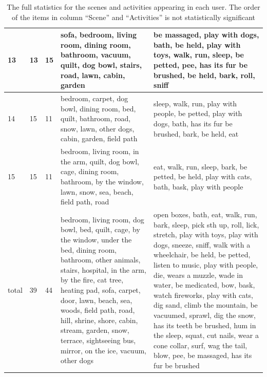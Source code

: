 \begin{table}[th]
\begin{center}
\begin{tabular}{l p{1cm} p{1cm} p{5cm} p{5cm}}
13 & 13 & 15 & sofa, bedroom, living room, dining room, bathroom, vacuum, quilt, dog bowl, stairs, road, lawn, cabin, garden & be massaged, play with dogs, bath, be held, play with toys, walk, run, sleep, be petted, pee, has its fur be brushed, be held, bark, roll, sniff\\\hline

14 & 15 & 11 & bedroom, carpet, dog bowl, dining room, bed, quilt, bathroom, road, snow, lawn, other dogs, cabin, garden, field path & sleep, walk, run, play with people, be petted, play with dogs, bath, has its fur be brushed, bark, be held, eat\\\hline

15 & 15 & 11 & bedroom, living room, in the arm, quilt, dog bowl, cage, dining room, bathroom, by the window, lawn, snow, sea, beach, field path, road & eat, walk, run, sleep, bark, be petted, be held, play with cats, bath, bask, play with people\\\hline

total & 39 & 44 & bedroom, living room, dog bowl, bed, quilt, cage, by the window, under the bed, dining room, bathroom, other animals, stairs, hospital, in the arm, by the fire, cat tree, heating pad, sofa, carpet, door, lawn, beach, sea, woods, field path, road, hill, shrine, shore, cabin, stream, garden, snow, terrace, sightseeing bus, mirror, on the ice, vacuum, other dogs & open boxes, bath, eat, walk, run, bark, sleep, pick sth up, roll, lick, stretch, play with toys, play with dogs, sneeze, sniff, walk with a wheelchair, be held, be petted, listen to music, play with people, die, wears a muzzle, wade in water, be medicated, bow, bask, watch fireworks, play with cats, dig sand, climb the mountain, be vacuumed, sprawl, dig the snow, has its teeth be brushed, hum in the sleep, squat, cut nails, wear a cone collar, surf, wag the tail, blow, pee, be massaged, has its fur be brushed\\
\hline
\end{tabular} 
\end{center}
\caption{The full statistics for the scenes and activities appearing in each user. The order of the items in column ``Scene'' and ``Activities'' is not statistically significant}
\label{tab: activity_scene_all}
\end{table}



